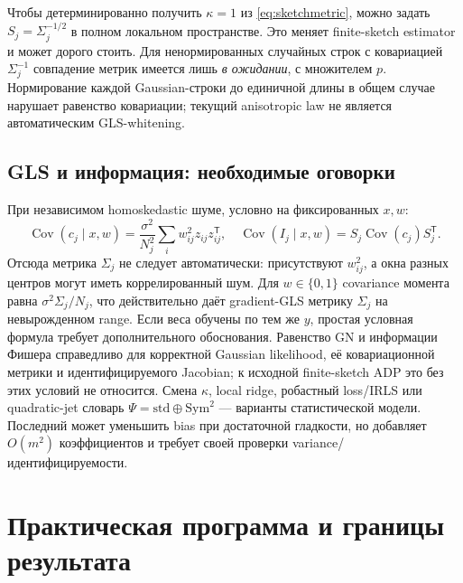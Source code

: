\documentclass[11pt,a4paper]{article}
\newcommand{\T}{^{\mathsf T}}
\begin{document}
Чтобы детерминированно получить $\kappa=1$ из \eqref{eq:sketchmetric},
можно задать $S_j=\Sigma_j^{-1/2}$ в полном локальном пространстве.
Это меняет finite-sketch estimator и может дорого стоить.
Для ненормированных случайных строк с ковариацией $\Sigma_j^{-1}$
совпадение метрик имеется лишь \emph{в ожидании}, с множителем $p$.
Нормирование каждой Gaussian-строки до единичной длины в общем случае
нарушает равенство ковариации; текущий anisotropic law не является
автоматическим GLS-whitening.

\subsection{GLS и информация: необходимые оговорки}
При независимом homoskedastic шуме, условно на фиксированных $x,w$:
\begin{equation}\label{eq:noise}
 \operatorname{Cov}(c_j\mid x,w)=
   \frac{\sigma^2}{N_j^2}\sum_iw_{ij}^2z_{ij}z_{ij}\T,
 \quad\operatorname{Cov}(I_j\mid x,w)=S_j\operatorname{Cov}(c_j)S_j\T.
\end{equation}
Отсюда метрика $\Sigma_j$ не следует автоматически: присутствуют
$w_{ij}^2$, а окна разных центров могут иметь коррелированный шум.
Для $w\in\{0,1\}$ covariance момента равна
$\sigma^2\Sigma_j/N_j$, что действительно даёт gradient-GLS метрику
$\Sigma_j$ на невырожденном range. Если веса обучены по тем же $y$,
простая условная формула требует дополнительного обоснования.
Равенство GN и информации Фишера справедливо для корректной Gaussian
likelihood, её ковариационной метрики и идентифицируемого Jacobian;
к исходной finite-sketch ADP это без этих условий не относится.
Смена $\kappa$, local ridge, робастный loss/IRLS или quadratic-jet словарь
$\Psi=\mathrm{std}\oplus\mathrm{Sym}^2$ --- варианты статистической модели.
Последний может уменьшить bias при достаточной гладкости, но добавляет
$O(m^2)$ коэффициентов и требует своей проверки variance/идентифицируемости.

\section{Практическая программа и границы результата}\label{sec:program}
\end{document}

